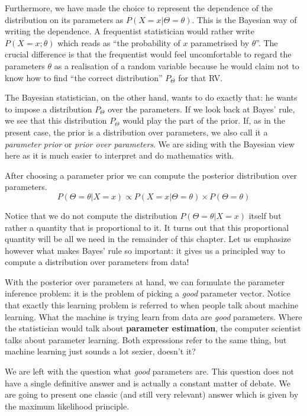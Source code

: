 Furthermore, we have made the choice to represent the dependence of the distribution on its
parameters as $ P(X=x|\Theta=\theta) $. This is the Bayesian way of writing the dependence. A frequentist statistician would rather write $ P(X=x; \theta) $ which reads as
``the probability of $ x $ parametrised by $ \theta $''. The crucial difference is that the frequentist would feel uncomfortable to regard the parameters $ \theta $
as a realisation of a random variable because he would claim not to know how to find ``the correct distribution'' $ P_{\Theta} $ for that RV.

The Bayesian statistician, on the other hand, wants to do exactly that: he wants to impose a distribution $ P_{\Theta} $ over the parameters. 
If we look back at Bayes' rule, we see that this distribution $ P_{\Theta}$ would play the part of the prior. If, as in the present case, the prior is a distribution over parameters,
we also call it a \emph{parameter prior} or \emph{prior over parameters}. We are siding with the Bayesian view here as it is much easier to interpret and do mathematics with.

After choosing a parameter prior we can compute the posterior distribution over parameters.
\begin{equation}
P(\Theta = \theta|X =x) \propto P(X=x|\Theta = \theta) \times P(\Theta = \theta)
\end{equation}

Notice that we do not compute the distribution $ P(\Theta = \theta|X =x) $ itself but rather a quantity that is proportional to it. It turns out that this proportional quantity will be all
we need in the remainder of this chapter. Let us emphasize however what makes Bayes' rule so important: it gives us a principled way to compute a
distribution over parameters from data!

With the posterior over parameters at hand, we can formulate the parameter inference problem: it is the problem of picking
a \emph{good} parameter vector. Notice that exactly this learning problem is referred to when people talk about machine learning. What the machine is trying learn from data are \emph{good} parameters. Where the statistician would talk about
\textbf{parameter estimation}, the computer scientist talks about parameter learning. Both expressions refer to the same thing, but machine learning just sounds a lot
sexier, doesn't it?

We are left with the question what \emph{good} parameters are. This question does not have a single definitive answer and is actually a constant matter of debate. We
are going to present one classic (and still very relevant) answer which is given by the maximum likelihood principle.



